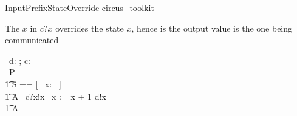 \begin{zsection}
  \SECTION InputPrefixStateOverride \parents circus\_toolkit
\end{zsection}

The $x$ in $c?x$ overrides the state $x$, hence is the output value is the one
being communicated
\begin{circus}
   \circchannel\ d: \nat; c: \nat \cross \nat \\ 
   \circprocess\ P \circdef\ \circbegin \\
        \t1 \circstate S == [~ x: \nat ~] \\
        \t1 A \circdef\ c?x!x \then\ x := x + 1 \circseq d!x \then \Skip \\
	\t1 \circspot A \\
  \circend
\end{circus}

